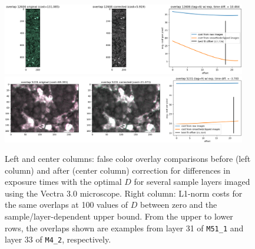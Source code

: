 \documentclass[letterpaper,11pt]{article}
\begin{document}
\begin{figure}[!ht]
\centering
\includegraphics[width=0.95\textwidth]{images/methods/cost_examples_vectra/overlay_comp_random_10478_offset=17.778}
\includegraphics[width=0.95\textwidth]{images/methods/cost_examples_vectra/overlay_comp_random_892_offset=21.314}
\caption{\footnotesize Left and center columns: false color overlay comparisons before (left column) and after (center column) correction for differences in exposure times with the optimal $D$ for several sample layers imaged using the Vectra 3.0 microscope. Right column: L1-norm costs for the same overlaps at 100 values of $D$ between zero and the sample/layer-dependent upper bound. From the upper to lower rows, the overlaps shown are examples from layer 31 of \texttt{M51\_1} and layer 33 of \texttt{M4\_2}, respectively.}
\label{fig:overlap_cost_examples_vectra_2}
\end{figure}
\end{document}

